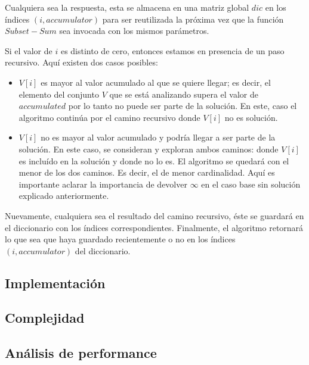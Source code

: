 Cualquiera sea la respuesta, esta se almacena en una matriz global $dic$ en los índices $(i, accumulator)$ para ser reutilizada la próxima vez que la función $Subset-Sum$ sea invocada con los mismos parámetros.

\vskip 8pt

Si el valor de $i$ es distinto de cero, entonces estamos en presencia de un paso recursivo. Aquí existen dos casos posibles:
\begin{itemize}
	\item $V[i]$ es mayor al valor acumulado al que se quiere llegar; es decir, el elemento del conjunto $V$ que se está analizando supera el valor de $accumulated$ por lo tanto no puede ser parte de la solución. En este, caso el algoritmo continúa por el camino recursivo donde $V[i]$ no es solución.
	\item $V[i]$ no es mayor al valor acumulado y podría llegar a ser parte de la solución. En este caso, se consideran y exploran ambos caminos: donde $V[i]$ es incluído en la solución y donde no lo es. El algoritmo se quedará con el menor de los dos caminos. Es decir, el de menor cardinalidad. Aquí es importante aclarar la importancia de devolver $\infty$ en el caso base sin solución explicado anteriormente.
\end{itemize}
Nuevamente, cualquiera sea el resultado del camino recursivo, éste se guardará en el diccionario con los índices correspondientes. Finalmente, el algoritmo retornará lo que sea que haya guardado recientemente o no en los índices $(i, accumulator)$ del diccionario.

\subsection{Implementación}
\subsection{Complejidad}
\subsection{Análisis de performance}